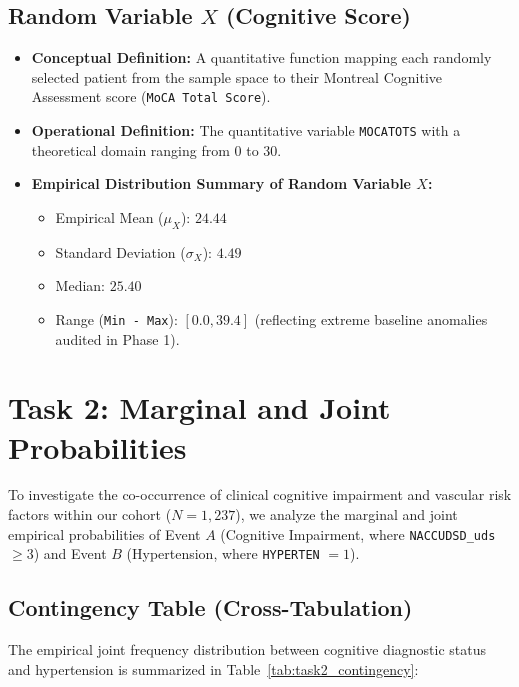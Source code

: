 \documentclass[11pt, a4paper]{article}
\begin{document}
\subsection{Random Variable $X$ (Cognitive Score)}
\begin{itemize}
    \item \textbf{Conceptual Definition:} A quantitative function mapping each randomly selected patient from the sample space to their Montreal Cognitive Assessment score (\texttt{MoCA Total Score}).
    \item \textbf{Operational Definition:} The quantitative variable \texttt{MOCATOTS} with a theoretical domain ranging from 0 to 30.
    \item \textbf{Empirical Distribution Summary of Random Variable $X$:}
    \begin{itemize}
        \item Empirical Mean ($\mu_X$): $24.44$
        \item Standard Deviation ($\sigma_X$): $4.49$
        \item Median: $25.40$
        \item Range (\texttt{Min - Max}): $[0.0, 39.4]$ (reflecting extreme baseline anomalies audited in Phase 1).
    \end{itemize}
\end{itemize}

\section{Task 2: Marginal and Joint Probabilities}
To investigate the co-occurrence of clinical cognitive impairment and vascular risk factors within our cohort ($N = 1,237$), we analyze the marginal and joint empirical probabilities of Event $A$ (Cognitive Impairment, where \texttt{NACCUDSD\_uds} $\ge 3$) and Event $B$ (Hypertension, where \texttt{HYPERTEN} $= 1$).

\subsection{Contingency Table (Cross-Tabulation)}
The empirical joint frequency distribution between cognitive diagnostic status and hypertension is summarized in Table~\ref{tab:task2_contingency}:
\end{document}
